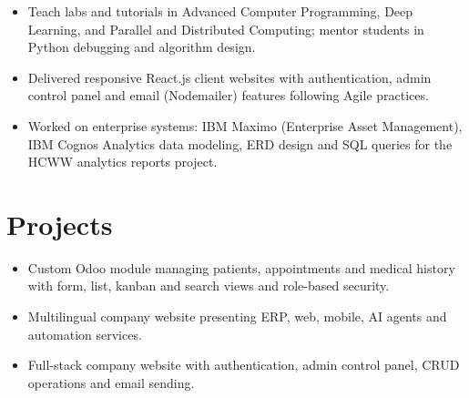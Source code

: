 \begin{itemize}
  \item Teach labs and tutorials in Advanced Computer Programming, Deep Learning, and Parallel and Distributed Computing; mentor students in Python debugging and algorithm design.
\end{itemize}

\begin{itemize}
  \item Delivered responsive React.js client websites with authentication, admin control panel and email (Nodemailer) features following Agile practices.
\end{itemize}

\begin{itemize}
  \item Worked on enterprise systems: IBM Maximo (Enterprise Asset Management), IBM Cognos Analytics data modeling, ERD design and SQL queries for the HCWW analytics reports project.
\end{itemize}

\section{Projects}
\begin{itemize}
  \item Custom Odoo module managing patients, appointments and medical history with form, list, kanban and search views and role-based security.
\end{itemize}
\begin{itemize}
  \item Multilingual company website presenting ERP, web, mobile, AI agents and automation services.
\end{itemize}
\begin{itemize}
  \item Full-stack company website with authentication, admin control panel, CRUD operations and email sending.
\end{itemize}

